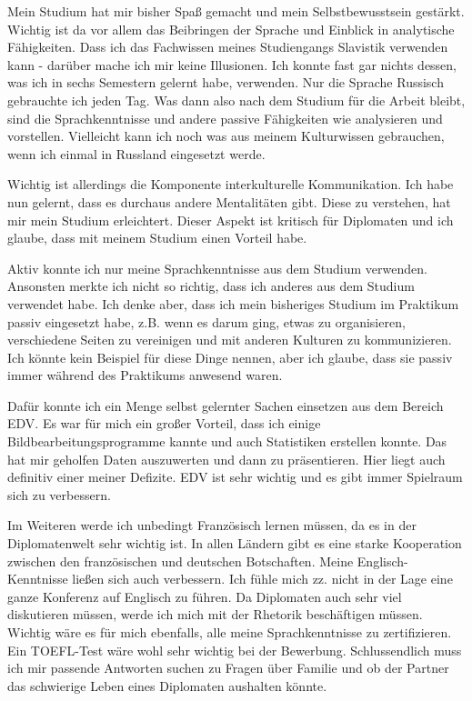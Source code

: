 \documentclass[12pt,a4paper, headsepline]{scrartcl}
\begin{document}
Mein Studium hat mir bisher Spaß gemacht und mein Selbstbewusstsein gestärkt. Wichtig ist da vor allem das Beibringen der Sprache und Einblick in analytische Fähigkeiten. Dass ich das Fachwissen meines Studiengangs Slavistik verwenden kann - darüber mache ich mir keine Illusionen. Ich konnte fast gar nichts dessen, was ich in sechs Semestern gelernt habe, verwenden. Nur die Sprache Russisch gebrauchte ich jeden Tag. Was dann also nach dem Studium für die Arbeit bleibt, sind die Sprachkenntnisse und andere passive Fähigkeiten wie analysieren und vorstellen. Vielleicht kann ich noch was aus meinem Kulturwissen gebrauchen, wenn ich einmal in Russland eingesetzt werde.

Wichtig ist allerdings die Komponente interkulturelle Kommunikation. Ich habe nun gelernt, dass es durchaus andere Mentalitäten gibt. Diese zu verstehen, hat mir mein Studium erleichtert. Dieser Aspekt ist kritisch für Diplomaten und ich glaube, dass mit meinem Studium einen Vorteil habe.

Aktiv konnte ich nur meine Sprachkenntnisse aus dem Studium verwenden. Ansonsten merkte ich nicht so richtig, dass ich anderes aus dem Studium verwendet habe. Ich denke aber, dass ich mein bisheriges Studium im Praktikum passiv eingesetzt habe, z.B. wenn es darum ging, etwas zu organisieren, verschiedene Seiten zu vereinigen und mit anderen Kulturen zu kommunizieren. Ich könnte kein Beispiel für diese Dinge nennen, aber ich glaube, dass sie passiv immer während des Praktikums anwesend waren.

Dafür konnte ich ein Menge selbst gelernter Sachen einsetzen aus dem Bereich EDV. Es war für mich ein großer Vorteil, dass ich einige Bildbearbeitungsprogramme kannte und auch Statistiken erstellen konnte. Das hat mir geholfen Daten auszuwerten und dann zu präsentieren. Hier liegt auch definitiv einer meiner Defizite. EDV ist sehr wichtig und es gibt immer Spielraum sich zu verbessern.

Im Weiteren werde ich unbedingt Französisch lernen müssen, da es in der Diplomatenwelt sehr wichtig ist. In allen Ländern gibt es eine starke Kooperation zwischen den französischen und deutschen Botschaften. Meine Englisch-Kenntnisse ließen sich auch verbessern. Ich fühle mich zz. nicht in der Lage eine ganze Konferenz auf Englisch zu führen. Da Diplomaten auch sehr viel diskutieren müssen, werde ich mich mit der Rhetorik beschäftigen müssen. Wichtig wäre es für mich ebenfalls, alle meine Sprachkenntnisse zu zertifizieren. Ein TOEFL-Test wäre wohl sehr wichtig bei der Bewerbung. Schlussendlich muss ich mir passende Antworten suchen zu Fragen über Familie und ob der Partner das schwierige Leben eines Diplomaten aushalten könnte.
\end{document}
